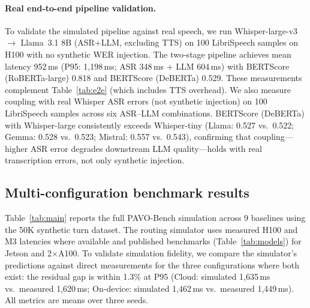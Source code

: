 \documentclass{article}
\begin{document}
\paragraph{Real end-to-end pipeline validation.}
To validate the simulated pipeline against real speech, we run Whisper-large-v3 $\to$ Llama~3.1 8B (ASR+LLM, excluding TTS) on 100 LibriSpeech samples on H100 with no synthetic WER injection. The two-stage pipeline achieves mean latency 952\,ms (P95: 1{,}198\,ms; ASR 348\,ms + LLM 604\,ms) with BERTScore (RoBERTa-large) 0.818 and BERTScore (DeBERTa) 0.529. These measurements complement Table~\ref{tab:e2e} (which includes TTS overhead). We also measure coupling with real Whisper ASR errors (not synthetic injection) on 100 LibriSpeech samples across six ASR--LLM combinations. BERTScore (DeBERTa) with Whisper-large consistently exceeds Whisper-tiny (Llama: 0.527 vs.\ 0.522; Gemma: 0.528 vs.\ 0.523; Mistral: 0.557 vs.\ 0.543), confirming that coupling---higher ASR error degrades downstream LLM quality---holds with real transcription errors, not only synthetic injection.

\subsection{Multi-configuration benchmark results}
\label{sec:benchmark_results}

Table~\ref{tab:main} reports the full PAVO-Bench simulation across 9 baselines using the 50K synthetic turn dataset. The routing simulator uses measured H100 and M3 latencies where available and published benchmarks (Table~\ref{tab:models}) for Jetson and 2$\times$A100. To validate simulation fidelity, we compare the simulator's predictions against direct measurements for the three configurations where both exist: the residual gap is within 1.3\% at P95 (Cloud: simulated 1{,}635\,ms vs.\ measured 1{,}620\,ms; On-device: simulated 1{,}462\,ms vs.\ measured 1{,}449\,ms). All metrics are means over three seeds.
\end{document}
